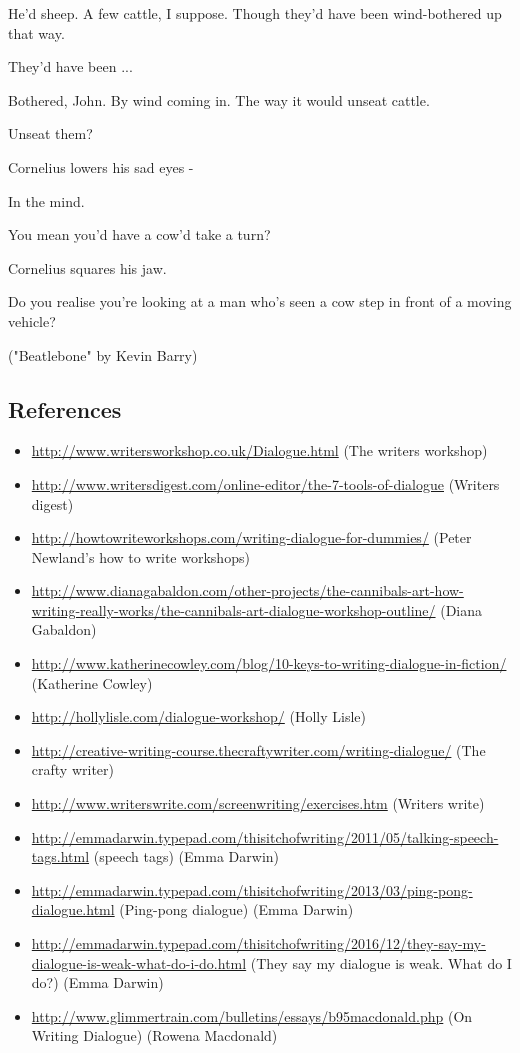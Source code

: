 \documentclass[11pt]{article}
\newenvironment{narrow}[2]{%
 \begin{list}{}{%
  \setlength{\topsep}{0pt}%
  \setlength{\leftmargin}{#1}%
  \setlength{\rightmargin}{#2}%
  \setlength{\listparindent}{\parindent}%
  \setlength{\itemindent}{\parindent}%
  \setlength{\parsep}{\parskip}%
 }%
\item[]}{\end{list}}
\begin{document}
\begin{itemize}
\begin{narrow}{1.0cm}{1.0cm}
He'd sheep. A few cattle, I suppose. Though they'd have been wind-bothered up that way.

They'd have been ...

Bothered, John. By wind coming in. The way it would unseat cattle.

Unseat them?

Cornelius lowers his sad eyes -

In the mind.

You mean you'd have a cow'd take a turn?

Cornelius squares his jaw.

Do you realise you're looking at a man who's seen a cow step in front of a moving vehicle?
\end{narrow}

("Beatlebone" by Kevin Barry)
\end{itemize}

\subsection*{References}
\begin{itemize}
\item \url{http://www.writersworkshop.co.uk/Dialogue.html} (The writers workshop)
\item \url{http://www.writersdigest.com/online-editor/the-7-tools-of-dialogue} (Writers digest)
\item \url{http://howtowriteworkshops.com/writing-dialogue-for-dummies/} (Peter Newland's how to write workshops)
\item \url{http://www.dianagabaldon.com/other-projects/the-cannibals-art-how-writing-really-works/the-cannibals-art-dialogue-workshop-outline/} (Diana Gabaldon)
\item \url{http://www.katherinecowley.com/blog/10-keys-to-writing-dialogue-in-fiction/} (Katherine Cowley)
\item \url{http://hollylisle.com/dialogue-workshop/} (Holly Lisle)
\item \url{http://creative-writing-course.thecraftywriter.com/writing-dialogue/} (The crafty writer)
\item \url{http://www.writerswrite.com/screenwriting/exercises.htm} (Writers write)
\item \url{http://emmadarwin.typepad.com/thisitchofwriting/2011/05/talking-speech-tags.html} (speech tags) (Emma Darwin)
\item \url{http://emmadarwin.typepad.com/thisitchofwriting/2013/03/ping-pong-dialogue.html} (Ping-pong dialogue) (Emma Darwin)
\item \url{http://emmadarwin.typepad.com/thisitchofwriting/2016/12/they-say-my-dialogue-is-weak-what-do-i-do.html} (They say my dialogue is weak. What do I do?) (Emma Darwin)

\item \url{http://www.glimmertrain.com/bulletins/essays/b95macdonald.php} (On Writing Dialogue) (Rowena Macdonald)
\end{itemize}
\end{document}
